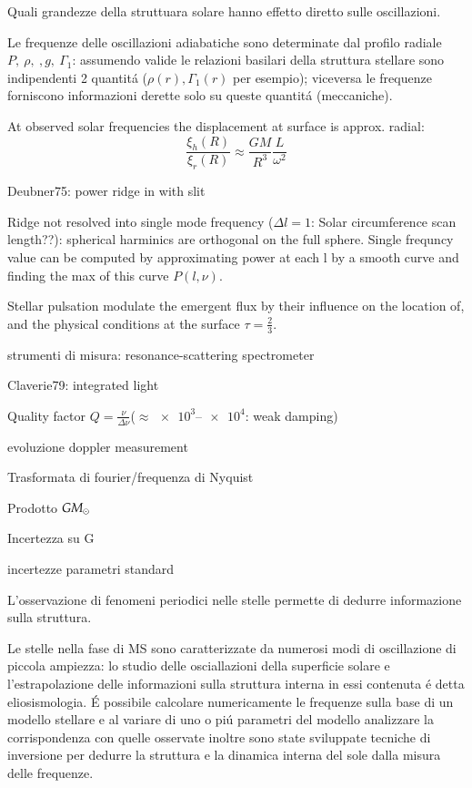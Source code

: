 \documentclass[oneside,12pt,fleqn]{memoir}
\begin{document}
\begin{itemize*}
\item Quali grandezze della struttuara solare hanno effetto diretto sulle oscillazioni.

Le frequenze delle oscillazioni adiabatiche sono determinate dal profilo radiale $P,\ \rho,\ ,g,\ \Gamma_1$: assumendo valide le relazioni basilari della struttura stellare  sono indipendenti 2  quantit\'a ($\rho(r),\Gamma_1(r)$ per esempio); viceversa le frequenze forniscono informazioni derette solo su queste quantit\'a (meccaniche).

\item At observed solar frequencies the displacement at surface is approx. radial:
\begin{equation*}
\frac{\xi_h(R)}{\xi_r(R)}\approx\frac{GM}{R^3}\frac{L}{\omega^2}
\end{equation*}

\item Deubner75: power ridge in \dgndi{} with slit
\item Ridge not resolved into single mode frequency ($\Delta l=1$: Solar circumference scan length??): spherical harminics are orthogonal on the full sphere. Single frequncy value can be computed by approximating power at each l by a smooth curve and finding the max of this curve $P(l,\nu)$.
\item Stellar pulsation modulate the emergent flux by their influence on the location of, and the physical conditions at the surface $\tau=\frac{2}{3}$.
\item strumenti di misura: resonance-scattering spectrometer
\item Claverie79: integrated light
\item Quality factor $Q=\frac{\nu}{\Delta\nu}$($\approx\numrange{e3}{e4}$: weak damping)
\item evoluzione doppler measurement
\item Trasformata di fourier/frequenza di Nyquist
\item Prodotto $GM_{\odot}$
\item Incertezza su G
\item incertezze parametri standard
\end{itemize*}


L'osservazione di fenomeni periodici nelle stelle permette di dedurre informazione sulla struttura.

Le stelle nella fase di MS  sono caratterizzate da numerosi modi di oscillazione di piccola ampiezza: lo studio delle osciallazioni della superficie solare e l'estrapolazione delle informazioni sulla struttura interna in essi contenuta \'e detta eliosismologia. \'E possibile calcolare numericamente le frequenze sulla base di un modello stellare e al variare di uno o pi\'u parametri del modello analizzare la corrispondenza con quelle osservate inoltre sono state sviluppate tecniche di inversione per dedurre la struttura e la dinamica interna del sole dalla misura delle frequenze.
\end{document}
